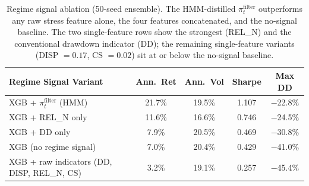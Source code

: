\begin{table}[H]
\centering
\smallskip
\begin{tabular}{lcccc}
\toprule
Regime Signal Variant & Ann.\ Ret & Ann.\ Vol & Sharpe & Max DD \\
\midrule
XGB + $\pi_t^{\text{filter}}$ (HMM)   & 21.7\% & 19.5\% & 1.107 & $-$22.8\% \\
XGB + REL\_N only                        & 11.6\% & 16.6\% & 0.746 & $-$24.5\% \\
XGB + DD only                            & 7.9\% & 20.5\% & 0.469 & $-$30.8\% \\
XGB (no regime signal)                   & 7.0\% & 20.4\% & 0.429 & $-$41.0\% \\
XGB + raw indicators (DD, DISP, REL\_N, CS) & 3.2\% & 19.1\% & 0.257 & $-$45.4\% \\
\bottomrule
\end{tabular}
\caption{Regime signal ablation (50-seed ensemble). The HMM-distilled $\pi_t^{\text{filter}}$ outperforms any raw stress feature alone, the four features concatenated, and the no-signal baseline. The two single-feature rows show the strongest (REL\_N) and the conventional drawdown indicator (DD); the remaining single-feature variants (DISP $=0.17$, CS $=0.02$) sit at or below the no-signal baseline.}
\label{tab:regime_signal_ablation}
\end{table}